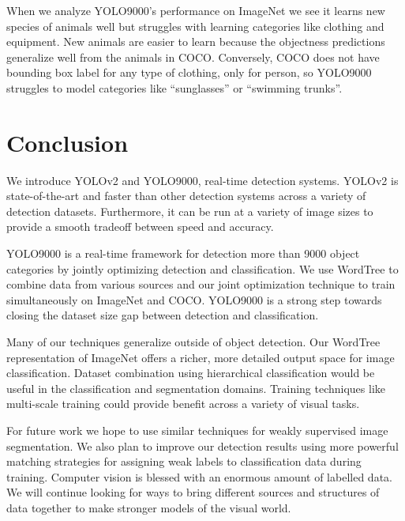 \documentclass[10pt,twocolumn,letterpaper]{article}
\begin{document}
When we analyze YOLO9000's performance on ImageNet we see it learns new species of animals well but struggles with learning categories like clothing and equipment. New animals are easier to learn because the objectness predictions generalize well from the animals in COCO. Conversely, COCO does not have bounding box label for any type of clothing, only for person, so YOLO9000 struggles to model categories like ``sunglasses'' or ``swimming trunks''.

\section{Conclusion}

We introduce YOLOv2 and YOLO9000, real-time detection systems. YOLOv2 is state-of-the-art and faster than other detection systems across a variety of detection datasets. Furthermore, it can be run at a variety of image sizes to provide a smooth tradeoff between speed and accuracy.

YOLO9000 is a real-time framework for detection more than 9000 object categories by jointly optimizing detection and classification. We use WordTree to combine data from various sources and our joint optimization technique to train simultaneously on ImageNet and COCO. YOLO9000 is a strong step towards closing the dataset size gap between detection and classification.

Many of our techniques generalize outside of object detection. Our WordTree representation of ImageNet offers a richer, more detailed output space for image classification. Dataset combination using hierarchical classification would be useful in the classification and segmentation domains. Training techniques like multi-scale training could provide benefit across a variety of visual tasks.

 For future work we hope to use similar techniques for weakly supervised image segmentation. We also plan to improve our detection results using more powerful matching strategies for assigning weak labels to classification data during training. Computer vision is blessed with an enormous amount of labelled data. We will continue looking for ways to bring different sources and structures of data together to make stronger models of the visual world.

{\small


}
\end{document}
